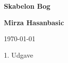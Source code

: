 \begin{titlepage}
    \begin{center}
        \vspace*{1cm}

        \Huge
        \textbf{Skabelon Bog}

        \vspace{0.5cm}
        \LARGE

        \vspace{1.5cm}

        \textbf{Mirza Hasanbasic}\\

        \vspace{1.5cm}

        \vfill

        \today

        \vspace{0.8cm}


        \Large
        1. Udgave

    \end{center}
\end{titlepage} 